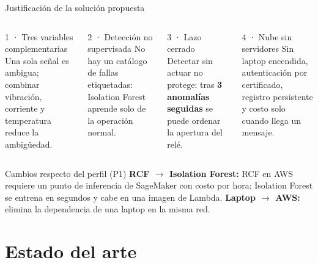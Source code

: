 \documentclass[aspectratio=169]{beamer}
\begin{document}
\begin{frame}{Justificación de la solución propuesta}
  \begin{columns}[T]
    \begin{block}{1 · Tres variables complementarias}
      \footnotesize Una sola señal es ambigua; combinar vibración, corriente y temperatura reduce
      la ambigüedad.
    \end{block}
    \begin{block}{2 · Detección no supervisada}
      \footnotesize No hay un catálogo de fallas etiquetadas: Isolation Forest aprende solo de la
      operación normal.
    \end{block}
    \begin{block}{3 · Lazo cerrado}
      \footnotesize Detectar sin actuar no protege: tras \textbf{3 anomalías seguidas} se puede
      ordenar la apertura del relé.
    \end{block}
    \begin{block}{4 · Nube sin servidores}
      \footnotesize Sin laptop encendida, autenticación por certificado, registro persistente y
      costo solo cuando llega un mensaje.
    \end{block}
  \end{columns}
  \vspace{0.15cm}
  \begin{alertblock}{Cambios respecto del perfil (P1)}
    \footnotesize
    \textbf{RCF $\rightarrow$ Isolation Forest:} RCF en AWS requiere un punto de inferencia de
    SageMaker con costo por hora; Isolation Forest se entrena en segundos y cabe en una imagen de
    Lambda.\quad
    \textbf{Laptop $\rightarrow$ AWS:} elimina la dependencia de una laptop en la misma red.
  \end{alertblock}
\end{frame}

\section{Estado del arte}
\end{document}
